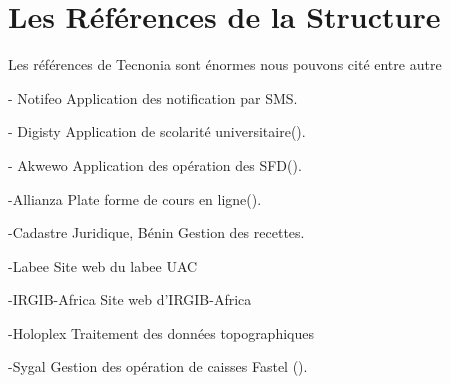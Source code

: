 \section{Les Références de la Structure}


Les références de Tecnonia sont énormes nous pouvons cité entre autre

- Notifeo
 Application des notification par SMS.

- Digisty
 Application de scolarité universitaire().

- Akwewo
 Application des opération des SFD().


-Allianza  
 Plate forme de cours en ligne().

-Cadastre Juridique, Bénin
Gestion des recettes.

-Labee
Site web du labee UAC

-IRGIB-Africa
Site web d'IRGIB-Africa

-Holoplex
Traitement des données topographiques

-Sygal
Gestion des opération de caisses Fastel ().


 

